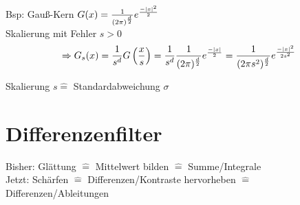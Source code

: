 Bsp: Gauß-Kern $G(x) = \frac{1}{(2 \pi)^{\frac{d}{2}}} e^{\frac{-\left\lvert x \right\rvert^2}{2}}$\\
Skalierung mit Fehler $s > 0$
$$ \Rightarrow G_s(x) = \frac{1}{s^d} G\left( \frac {x} {s} \right) = \frac{1}{s^d} \frac{1}{(2 \pi)^{\frac{d}{2}}} e^{\frac{-\left\lvert x \right\rvert}{2}} = \frac{1}{(2 \pi s^2)^{\frac{d}{2}}} e^{\frac{-\left\lvert x \right\rvert^2}{2s^2}}$$

Skalierung $s \hat = $ Standardabweichung $\sigma$

\newcommand{\mtitle}[1] {
    \begin{center}
        \large{\textbf{#1}}
    \end{center}
}

\newcommand{\filter}[1] {
	\begin{tabular}{|c|c|c|}
		\hline
		#1\\
		\hline
	\end{tabular}
	}
	

\section{Differenzenfilter}

    Bisher: Glättung $\widehat =$ Mittelwert bilden $\widehat =$ Summe/Integrale\\
    Jetzt: Schärfen $\widehat =$ Differenzen/Kontraste hervorheben $\widehat =$ Differenzen/Ableitungen\\

